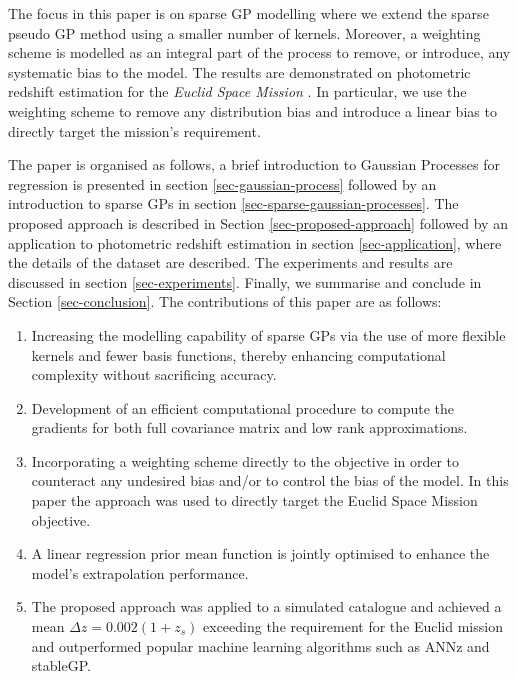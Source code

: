 \documentclass[useAMS,usenatbib,fleqn]{mn2e}
\begin{document}
The focus in this paper is on sparse GP modelling where we extend the sparse pseudo GP method using a smaller number of kernels. Moreover, a weighting scheme is modelled as an integral part of the process to remove, or introduce, any systematic bias to the model. The results are demonstrated on photometric redshift estimation for the {\em Euclid Space Mission} \citep{laureijs2011}. In particular, we use the weighting scheme to remove any distribution bias and introduce a linear bias to directly target the mission's requirement. 

The paper is organised as follows, a brief introduction to Gaussian Processes for regression is presented in section \ref{sec-gaussian-process} followed by an introduction to sparse GPs in section \ref{sec-sparse-gaussian-processes}. The proposed approach is described in Section \ref{sec-proposed-approach} followed by an application to photometric redshift estimation in section \ref{sec-application}, where the details of the dataset are described. The experiments and results are discussed in section \ref{sec-experiments}. Finally, we summarise and conclude in Section \ref{sec-conclusion}. The contributions of this paper are as follows:
\begin{enumerate}
  \item Increasing the modelling capability of sparse GPs via the use of more flexible kernels and fewer basis functions, thereby enhancing computational complexity without sacrificing accuracy.
  \item Development of an efficient computational procedure to compute the gradients for both full covariance matrix and low rank approximations.
  \item Incorporating a weighting scheme directly to the objective in order to counteract any undesired bias and/or to control the bias of the model. In this paper the approach was used to directly target the Euclid Space Mission objective.
  \item A linear regression prior mean function is jointly optimised to enhance the model's extrapolation performance.
  \item The proposed approach was applied to a simulated catalogue and achieved  a mean $\Delta z = 0.002(1+z_{s})$ exceeding the requirement for the Euclid mission and outperformed popular machine learning algorithms such as ANNz and stableGP.
\end{enumerate}
\end{document}
